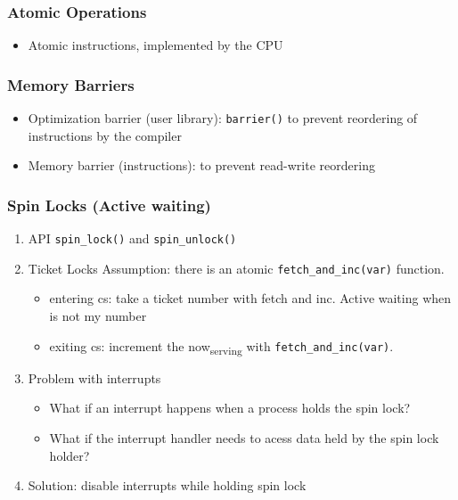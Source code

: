 \documentclass[11pt]{article}
\begin{document}
\subsubsection{Atomic Operations}
\label{sec:orgfb95a59}
\begin{itemize}
\item Atomic instructions, implemented by the CPU
\end{itemize}
\subsubsection{Memory Barriers}
\label{sec:org8f4b66d}
\begin{itemize}
\item Optimization barrier (user library): \texttt{barrier()} to prevent reordering of
instructions by the compiler
\item Memory barrier (instructions): to prevent read-write reordering
\end{itemize}
\subsubsection{Spin Locks (Active waiting)}
\label{sec:org9f5a8e9}
\begin{enumerate}
\item API
\label{sec:org7a9ee21}
\texttt{spin\_lock()} and \texttt{spin\_unlock()}
\item Ticket Locks
\label{sec:org5bd43f0}
Assumption: there is an atomic \texttt{fetch\_and\_inc(var)} function.
\begin{itemize}
\item entering cs: take a ticket number with fetch and inc. Active waiting when is
not my number
\item exiting cs: increment the now\textsubscript{serving} with \texttt{fetch\_and\_inc(var)}.
\end{itemize}

\item Problem with interrupts
\label{sec:orge51bfdb}
\begin{itemize}
\item What if an interrupt happens when a process holds the spin lock?
\item What if the interrupt handler needs to acess data held by the spin lock holder?
\end{itemize}
\item Solution: disable interrupts while holding spin lock
\label{sec:orgc4e89b0}
\end{enumerate}
\end{document}
